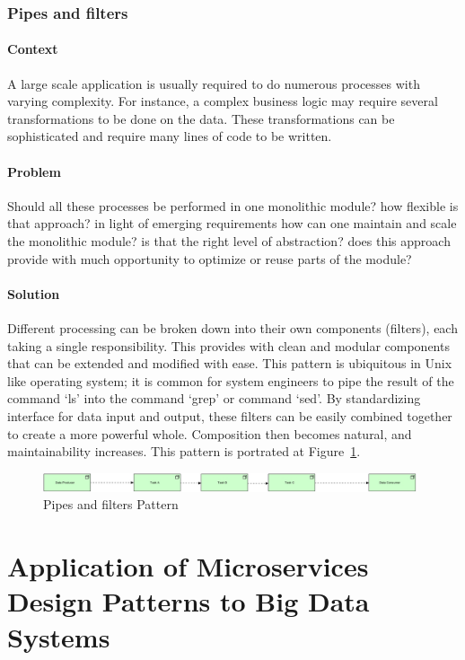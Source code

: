 \documentclass{bmcart}
\begin{document}
\subsubsection{Pipes and filters}
\paragraph{Context}
A large scale application is usually required to do numerous processes with varying complexity. For instance, a complex business logic may require several transformations to be done on the data. These transformations can be sophisticated and require many lines of code to be written.

\paragraph{Problem}
Should all these processes be performed in one monolithic module? how flexible is that approach? in light of emerging requirements how can one maintain and scale the monolithic module? is that the right level of abstraction? does this approach provide with much opportunity to optimize or reuse parts of the module? 

\paragraph{Solution}

Different processing can be broken down into their own components (filters), each taking a single responsibility. This provides with clean and modular components that can be extended and modified with ease. This pattern is ubiquitous in Unix like operating system; it is common for system engineers to pipe the result of the command `ls' into the command `grep' or command `sed'. By standardizing interface for data input and output, these filters can be easily combined together to create a more powerful whole. Composition then becomes natural, and maintainability increases. This pattern is portrated at Figure~\ref{PipesAndFilters}.


\begin{figure}[h]
  \includegraphics[width=11cm]{Media/Pipes and Filters.jpg}
  \caption{Pipes and filters Pattern}
  \label{PipesAndFilters}
\end{figure}

\section{Application of Microservices Design Patterns to Big Data Systems} \label{Mapping}
\end{document}
